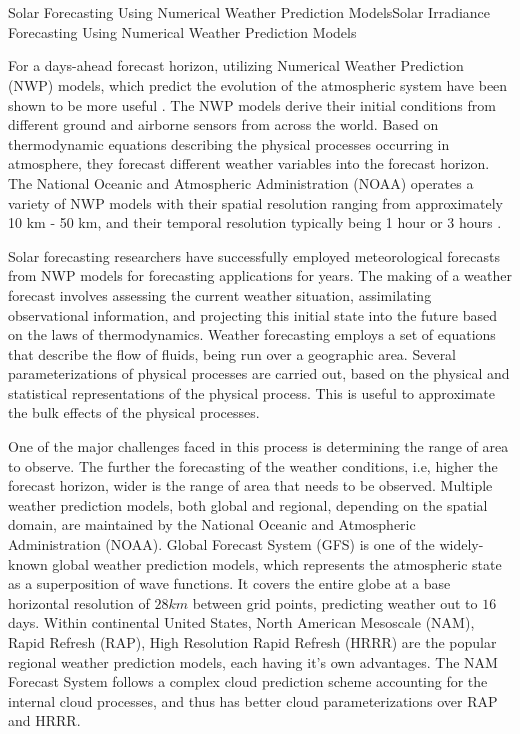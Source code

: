 \chapter{}{{Solar Forecasting Using Numerical Weather Prediction Models}}{Solar Irradiance Forecasting Using Numerical Weather Prediction Models}

For a days-ahead forecast horizon, utilizing Numerical Weather Prediction (NWP) models, which predict the evolution of the atmospheric system have been shown to be more useful \cite{thesis_zach}. The NWP models derive their initial conditions from different ground and airborne sensors from across the world. Based on thermodynamic equations describing the physical processes occurring in atmosphere, they forecast different weather variables into the forecast horizon. The National Oceanic and Atmospheric Administration (NOAA) operates a variety of NWP models with their spatial resolution ranging from approximately 10 km - 50 km, and their temporal resolution typically being 1 hour or 3 hours \cite{multimodel_bestpractices}. 

\par Solar forecasting researchers have successfully employed meteorological forecasts from NWP models for forecasting applications for years. The making of a weather forecast involves assessing the current weather situation, assimilating observational information, and projecting this initial state into the future based on the laws of thermodynamics. Weather forecasting employs a set of equations that describe the flow of fluids, being run over a geographic area. Several parameterizations of physical processes are carried out, based on the physical and statistical representations of the physical process. This is useful to approximate the bulk effects of the physical processes.

\par One of the major challenges faced in this process is determining the range of area to observe. The further the forecasting of the weather conditions, i.e, higher the forecast horizon, wider is the range of area that needs to be observed. Multiple weather prediction models, both global and regional, depending on the spatial domain, are maintained by the National Oceanic and Atmospheric Administration (NOAA). Global Forecast System (GFS) is one of the widely-known global weather prediction models, which represents the atmospheric state as a superposition \restoregeometry\noindent of wave functions. It covers the entire globe at a base horizontal resolution of $28km$ between grid points, predicting weather out to $16$ days. Within continental United States, North American Mesoscale (NAM), Rapid Refresh (RAP), High Resolution Rapid Refresh (HRRR) are the popular regional weather prediction models, each having it's own advantages. The NAM Forecast System follows a complex cloud prediction scheme accounting for the internal cloud processes, and thus has better cloud parameterizations over RAP and HRRR. 

